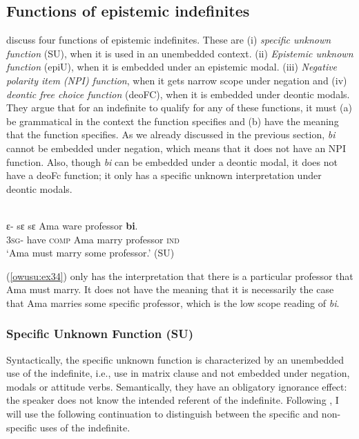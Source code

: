 \documentclass[output=paper,modfonts,nonflat,draftmode]{langsci/langscibook}
\begin{document}
\subsection{Functions of epistemic indefinites}

\citet{AloniPort2015} discuss four functions of epistemic indefinites. These are (i) \emph{specific unknown function} (SU), when it is used in an unembedded context. (ii) \emph{Epistemic unknown function} (epiU), when it is embedded under an epistemic modal. (iii) \emph{Negative polarity item (NPI) function}, when it gets narrow scope under negation and (iv) \emph{deontic free choice function} (deoFC), when it is embedded under deontic modals. They argue that for an indefinite to qualify for any of these functions, it must (a) be grammatical in the context the function specifies and (b) have the meaning that the function specifies. As we already discussed in the previous section, \emph{bi} cannot be embedded under negation, which means that it does not have an NPI function. Also, though \emph{bi} can be embedded under a deontic modal, it does not have a deoFc function; it only has a specific unknown interpretation under deontic modals. 

\ea\label{owusu:ex34}\\
 \gll ε- sε  sε Ama ware professor \textbf{bi}.\\
\textsc{3sg}- have \textsc{comp} Ama marry professor \textsc{ind} \\
    
\glt `Ama must marry some professor.' (SU)

\z (\ref{owusu:ex34}) only has the interpretation that there is a particular professor that Ama must marry. It does not have the meaning that it is necessarily the case that Ama marries some specific professor, which is the low scope reading of \emph{bi}. 



\subsubsection{Specific Unknown Function (SU)}
Syntactically, the specific unknown function is characterized by an unembedded use of the indefinite, i.e., use in matrix clause and not embedded under negation, modals or attitude verbs. Semantically, they have an obligatory ignorance effect: the speaker does not know the intended referent of the indefinite. Following \citet{AloniPort2015}, I will use the following continuation to distinguish between the specific and non-specific uses of the indefinite.
\end{document}
